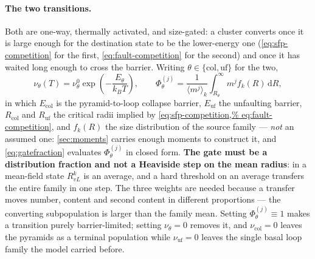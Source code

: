 \documentclass{article}
\begin{document}
\paragraph{The two transitions.} Both are one-way, thermally activated, and
size-gated: a cluster converts once it is large enough for the destination state
to be the lower-energy one (\cref{eq:sfp-competition} for the first,
\cref{eq:fault-competition} for the second) and once it has waited long enough to
cross the barrier. Writing $\theta\in\{\mathrm{col},\mathrm{uf}\}$ for the two,
\begin{equation}
  \nu_\theta(T)=\nu^0_\theta\exp\!\left(-\frac{E_\theta}{k_BT}\right),
  \qquad
  \Phi^{(j)}_\theta=\frac{1}{\langle m^j\rangle_k}
     \int_{R_\theta}^{\infty}\!\!m^{j}f_k(R)\,\mathrm dR ,
  \label{eq:barrier}
\end{equation}
in which $E_{\mathrm{col}}$ is the pyramid-to-loop collapse barrier,
$E_{\mathrm{uf}}$ the unfaulting barrier, $R_{\mathrm{col}}$ and
$R_{\mathrm{uf}}$ the critical radii implied by \cref{eq:sfp-competition,%
eq:fault-competition}, and $f_k(R)$ the size distribution of the source family
--- \emph{not} an assumed one: \cref{sec:moments} carries enough moments to
construct it, and \cref{eq:gatefraction} evaluates $\Phi^{(j)}_\theta$ in closed
form. \textbf{The gate must be a distribution fraction and not a Heaviside step
on the mean radius}: in a mean-field state $R^k_{vL}$ is an average, and a hard
threshold on an average transfers the entire family in one step. The three
weights are needed because a transfer moves number, content and second content
in different proportions --- the converting subpopulation is larger than the
family mean. Setting
$\Phi^{(j)}_\theta\equiv1$ makes a transition purely barrier-limited; setting
$\nu_\theta=0$ removes it, and $\nu_{\mathrm{col}}=0$ leaves the pyramids as a
terminal population while $\nu_{\mathrm{uf}}=0$ leaves the single basal loop
family the model carried before.
\end{document}
